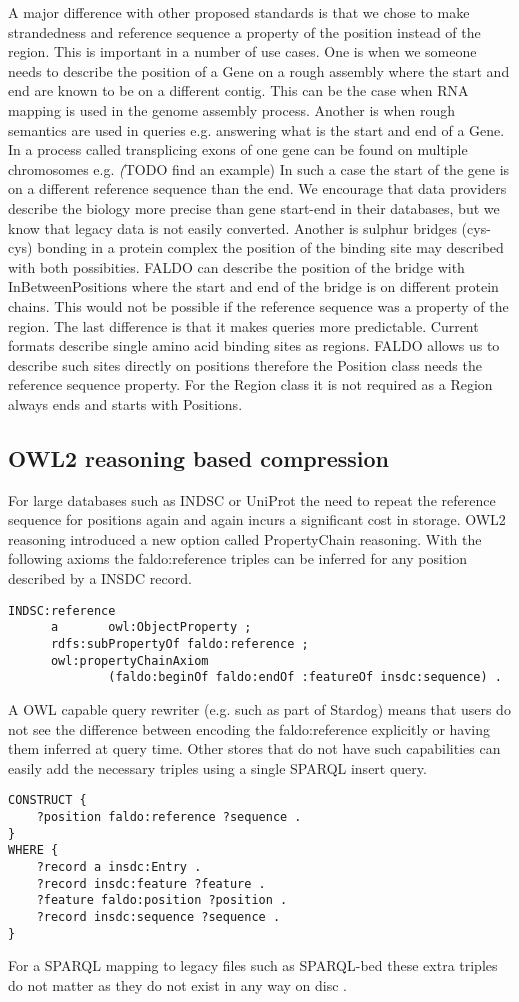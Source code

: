 A major difference with other proposed standards is that we chose to make strandedness and reference sequence a property of the position instead of the region.
This is important in a number of use cases.
One is when we someone needs to describe the position of a Gene on a rough assembly where the start and end are known to be on a different contig. 
This can be the case when RNA mapping is used in the genome assembly process.
Another is when rough semantics are used in queries e.g. answering what is the start and end of a Gene. 
In a process called transplicing exons of one gene can be found on multiple chromosomes e.g. \textit(TODO find an example)
In such a case the start of the gene is on a different reference sequence than the end.
We encourage that data providers describe the biology more precise than gene start-end in their databases, but we know that legacy data is not easily converted.
Another is sulphur bridges (cys-cys) bonding in a protein complex the position of the binding site may described with both possibities.
FALDO can describe the position of the bridge with InBetweenPositions where the start and end of the bridge is on different protein chains.
This would not be possible if the reference sequence was a property of the region. 
The last difference is that it makes queries more predictable. 
Current formats describe single amino acid binding sites as regions.
FALDO allows us to describe such sites directly on positions therefore the Position class needs the reference sequence property.
For the Region class it is not required as a Region always ends and starts with Positions.

\subsection*{OWL2 reasoning based compression}
For large databases such as INDSC or UniProt the need to repeat the reference sequence for positions again and again incurs a significant cost in storage.
OWL2 reasoning introduced a new option called PropertyChain reasoning. 
With the following axioms the faldo:reference triples can be inferred for any position described by a INSDC record.
\begin{verbatim}
INDSC:reference
      a       owl:ObjectProperty ;
      rdfs:subPropertyOf faldo:reference ;
      owl:propertyChainAxiom
              (faldo:beginOf faldo:endOf :featureOf insdc:sequence) .
\end{verbatim}
A OWL capable query rewriter (e.g. such as part of Stardog) means that users do not see the difference between encoding the faldo:reference explicitly or having them inferred at query time.
Other stores that do not have such capabilities can easily add the necessary triples using a single SPARQL insert query.
\begin{verbatim}
CONSTRUCT {
    ?position faldo:reference ?sequence .
}
WHERE {
    ?record a insdc:Entry .
    ?record insdc:feature ?feature .
    ?feature faldo:position ?position .
    ?record insdc:sequence ?sequence .
}
\end{verbatim} 
For a SPARQL mapping to legacy files such as SPARQL-bed these extra triples do not matter as they do not exist in any way on disc .


